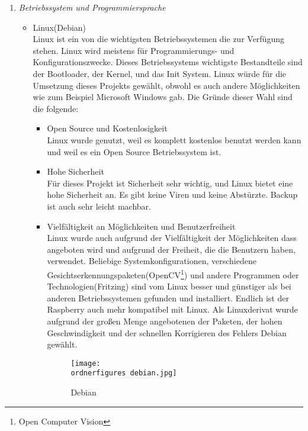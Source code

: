 \begin{enumerate}
	\item \textit{Betriebssystem und Programmiersprache} \\
		\begin{itemize}
			\item Linux(Debian) \\
			Linux ist ein von die wichtigsten Betriebssystemen die zur Verfügung stehen. Linux wird meistens für Programmierungs- und Konfigurationszwecke. Dieses Betriebssystems wichtigste Bestandteile sind der Bootloader, der Kernel, und das Init System. Linux würde für die Umsetzung dieses Projekts gewählt, obwohl es auch andere Möglichkeiten wie zum Beispiel Microsoft Windows gab. Die Gründe dieser Wahl sind die folgende: 
			 	\begin{itemize}
			 		\item Open Source und Kostenlosigkeit \\
			 			Linux wurde genutzt, weil es komplett kostenlos benutzt werden kann und weil es ein Open Source Betriebssystem ist.
			 		\item Hohe Sicherheit \\
			 			Für dieses Projekt ist Sicherheit sehr wichtig, und Linux bietet eine hohe Sicherheit an. Es gibt keine Viren und keine Abstürzte. Backup ist auch sehr leicht machbar.
			 		\item Vielfältigkeit an Möglichkeiten und Benutzerfreiheit \\
			 		Linux wurde auch aufgrund der Vielfältigkeit der Möglichkeiten dass angeboten wird und aufgrund der Freiheit, die die Benutzern haben, verwendet. Beliebige Systemkonfigurationen, verschiedene Gesichtserkennungspaketen(OpenCV\footnote{Open Computer Vision}) und andere Programmen oder Technologien(Fritzing) sind vom Linux besser und günstiger als bei anderen Betriebssystemen gefunden und installiert. Endlich ist der Raspberry auch mehr kompatibel mit Linux.
			 		Als Linuxderivat wurde aufgrund der großen Menge angebotenen der Paketen, der hohen Geschwindigkeit und der schnellen Korrigieren des Fehlers Debian gewählt.\cite{Linux}
			\begin{figure}[H]
				\texttt{[image: \\ordnerfigures debian.jpg]}
				\centering
				\caption{Debian}
			\end{figure}\cite{DebianBild}	
		 	\end{itemize}
	 

\end{itemize}
\end{enumerate}
